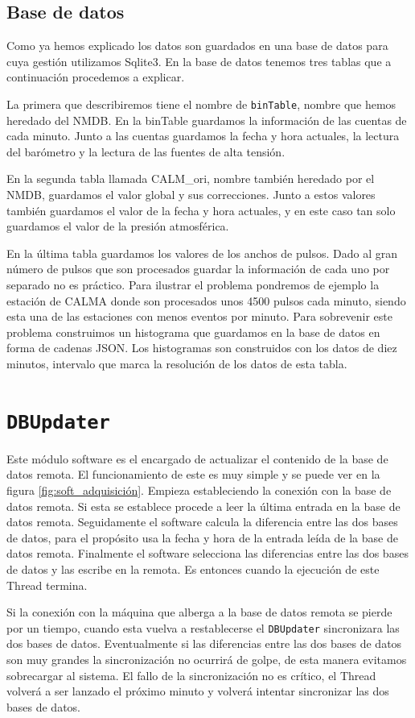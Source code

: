 	\subsection{Base de datos}
		Como ya hemos explicado los datos son guardados en una base de datos para cuya gestión utilizamos Sqlite3. En la base de datos tenemos
		tres tablas que a continuación procedemos a explicar.
	    	\par
	    	La primera que describiremos tiene el nombre de \texttt{binTable}, nombre que hemos heredado del NMDB. En la binTable guardamos la
		información de las cuentas de cada minuto. Junto a las cuentas guardamos la fecha y hora actuales, la lectura del barómetro y la
		lectura de las fuentes de alta tensión.
	    	\par 
	    	En la segunda tabla llamada CALM\_ori, nombre también heredado por el NMDB, guardamos el valor global y sus correcciones. Junto a estos
		valores también guardamos el valor de la fecha y hora actuales, y en este caso tan solo guardamos el valor de la presión atmosférica.
	    	\par
	    	En la última tabla guardamos los valores de los anchos de pulsos. Dado al gran número de pulsos que son procesados guardar la
		información de cada uno por separado no es práctico. Para ilustrar el problema pondremos de ejemplo la estación de CALMA donde son
		procesados unos 4500 pulsos cada minuto, siendo esta una de las estaciones con menos eventos por minuto. Para sobrevenir este problema
		construimos un histograma que guardamos en la base de datos en forma de cadenas JSON\cite{JSON}. Los histogramas son construidos con
		los datos de diez minutos, intervalo que marca la resolución de los datos de esta tabla.

\section{\texttt{DBUpdater}}
	Este módulo software es el encargado de actualizar el contenido de la base de datos remota. El funcionamiento de este es muy simple y se puede
	ver en la figura \ref{fig:soft_adquisición}. Empieza estableciendo la conexión con la base de datos remota. Si esta se establece procede a leer la
	última entrada en la base de datos remota. Seguidamente el software calcula la diferencia entre las dos bases de datos, para el propósito usa
	la fecha y hora de la entrada leída de la base de datos remota. Finalmente el software selecciona las diferencias entre las dos bases de datos
	y las escribe en la remota. Es entonces cuando la ejecución de este Thread termina. 
	\par
	Si la conexión con la máquina que alberga a la base de datos remota se pierde por un tiempo, cuando esta vuelva a restablecerse el 
	\texttt{DBUpdater} sincronizara las dos bases de datos. Eventualmente si las diferencias entre las dos bases de datos son muy grandes la
	sincronización no ocurrirá de golpe, de esta manera evitamos sobrecargar al sistema. El fallo de la sincronización no es crítico, el Thread
	volverá a ser lanzado el próximo minuto y volverá intentar sincronizar las dos bases de datos.

